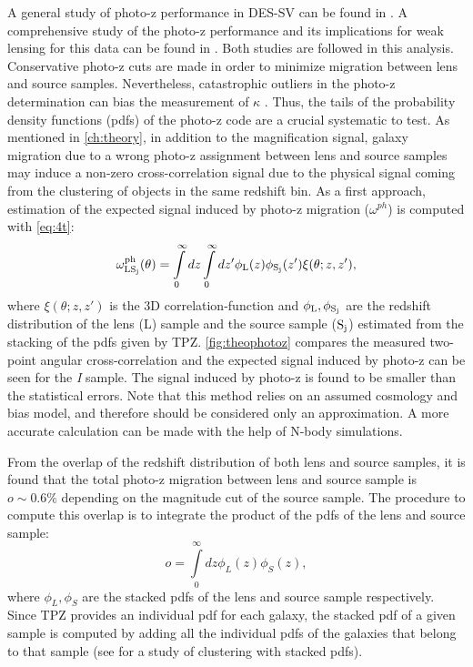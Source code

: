 A general study of photo-z performance in DES-SV can be found in \cite{2014MNRAS.445.1482S}. A comprehensive study of the photo-z performance and its implications for weak lensing for this data can be found in \cite{PhysRevD.94.042005}. Both studies are followed in this analysis.
\newline
	Conservative photo-z cuts are made in order to minimize migration between lens and source samples. Nevertheless, catastrophic outliers in the photo-z determination can bias the measurement of  $\kappa$ \cite{2010MNRAS.401.1399B}. Thus, the tails of the probability density functions (pdfs) of the photo-z code are a crucial systematic to test.
	\newline
	As mentioned in \autoref{ch:theory}, in addition to the magnification signal, galaxy migration due to a wrong photo-z assignment between lens and source samples may induce a non-zero cross-correlation signal due to the physical signal coming from the clustering of objects in the same redshift bin. As a first approach, estimation of the expected signal induced by photo-z migration ($\omega^{ph}$) is computed with \autoref{eq:4t}:
\begin{equation}
\omega_{\rm LS_j}^{\rm ph}(\theta) = \int\limits_0^\infty dz\int\limits_0^\infty dz' \phi_{\rm L}(z)\phi_{\rm S_j}(z')\xi(\theta;z,z'),
\label{eq:phth}
\end{equation}
where $\xi(\theta;z,z')$ is the 3D correlation-function and $\phi_{\rm L},\phi_{\rm S_j}$ are the redshift distribution of the lens (L) sample and the source sample ($\rm S_j$) estimated from the stacking of the pdfs given by TPZ. \autoref{fig:theophotoz} compares the measured two-point angular cross-correlation and the expected signal induced by photo-z can be seen for the \textit{I} sample. The signal induced by photo-z is found to be smaller than the statistical errors. Note that this method relies on an assumed cosmology and bias model, and therefore should be considered only an approximation. A more accurate calculation can be made with the help of N-body simulations.
\newline

From the overlap of the redshift distribution of both lens and source samples, it is found that the total photo-z migration between lens and source sample is $o\sim 0.6\%$ depending on the magnitude cut of the source sample. The procedure to compute this overlap is to integrate the product of the pdfs of the lens and source sample:
\begin{equation}
o = \int\limits_0^\infty dz\phi_L(z)\phi_S(z),
\end{equation}
where $\phi_L,\phi_S$ are the stacked pdfs of the lens and source sample respectively. Since TPZ provides an individual pdf for each galaxy, the stacked pdf of a given sample is computed by adding all the individual pdfs of the galaxies that belong to that sample (see \cite{2016MNRAS.459.1293A} for a study of clustering with stacked pdfs).
\newline

